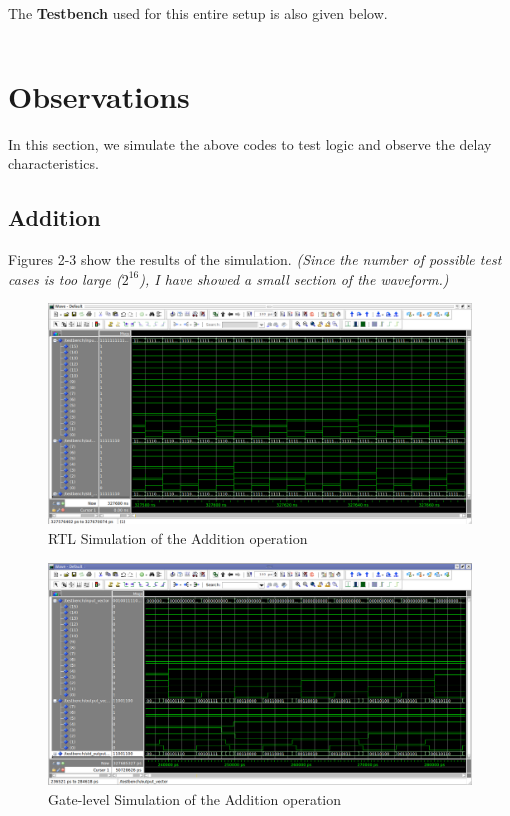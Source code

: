 \documentclass[a4paper, 11pt]{article}
\begin{document}
\inputminted[linenos]{vhdl}{ALU_exp/my_alu.vhd}
The \textbf{Testbench} used for this entire setup is also given below.
\inputminted[linenos]{vhdl}{ALU_exp/Testbench.vhd}

\newpage
\section{Observations}
In this section, we simulate the above codes to test logic and observe the delay characteristics.
\subsection{Addition}
Figures 2-3 show the results of the simulation. \emph{(Since the number of possible test cases is too large ($2^{16}$), I have showed a small section of the waveform.)}

\begin{figure}[h]
\centering
\includegraphics[scale=0.33]{Adder_RTL}
\caption{RTL Simulation of the Addition operation}
\end{figure}

\begin{figure}[H]
\centering
\includegraphics[scale=0.33]{Adder_Gate}
\caption{Gate-level Simulation of the Addition operation}
\end{figure}
\end{document}
